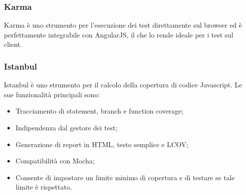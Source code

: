 \subsubsection{Karma}
Karma è uno strumento per l'esecuzione dei test direttamente sul browser ed è perfettamente integrabile con AngularJS, il che lo rende ideale per i test sul client.


\subsubsection{Istanbul}
\label{Istabull}
Istanbul è uno strumento per il calcolo della copertura di codice Javascript. Le sue funzionalità principali sono:
\begin{itemize}
\item Tracciamento di statement, branch e function coverage;
\item Indipendenza dal gestore dei test;
\item Generazione di report in HTML, testo semplice e LCOV;
\item Compatibilità con Mocha;
\item Consente di impostare un limite minimo di copertura e di testare se tale limite è rispettato.
\end{itemize}



